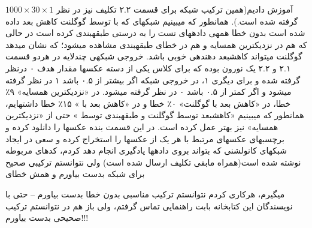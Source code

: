 \documentclass[10pt,a4paper]{article}
\newcommand{\نیمفاصله}{\halfspace}
\renewcommand{\ }{\halfspace}
\newcommand{\مق}{\lr}
\begin{document}
$1000 \times 30 \times 1$
آموزش دادیم(همین ترکیب شبکه برای قسمت ۲.۲ تکلیف نیز در نظر گرفته شده است.). همان\ طور که می\ بینیم شبکه\ ای که با توسط گوگل\ نت کاهش بعد داده شده است بدون خطا همه\ ی داده\ های تست را به درستی طبقه\ بندی کرده است در حالی که هم در نزدیک\ ترین همسایه و هم در \مق{PCA} خطای طبقه\ بندی مشاهده می\ شود؛ که نشان می\ دهد گوگل\ نت می\ تواند کاهش\ بعد دهنده\ ی خوبی باشد.
خروجی شبکه\ ی چندلایه در هردو قسمت ۲.۱ و ۲.۲ یک نورون بوده که برای کلاس یکی از دسته عکس\ ها مقدار هدف ۰ درنظر گرفته شده و برای دیگری ۱، در خروجی شبکه اگر بیشتر از ۰.۵ باشد ۱ در نظر گرفته می\ شود و اگر کمتر از ۰.۵ باشد ۰ در نظر گرفته می\ شود. در «نزدیک\ ترین همسایه» ۹٪ خطا، در «کاهش بعد با گوگل\ نت» ۰٪ خطا و در «کاهش بعد با \مق{PCA}» ۱۵٪ خطا داشته\ ایم، همان\ طور که می\ بینیم «کاهش\ بعد توسط گوگل\ نت و طبقه\ بندی توسط \مق{MLP}» حتی از «نزدیک\ ترین همسایه» نیز بهتر عمل کرده است.
در این قسمت بنده عکس\ ها را دانلود کرده و برچسب\ های عکس\ های مرتبط با هر یک از عکس\ ها را استخراج کرده و سعی در ایجاد شبکه\ ای کانولشنی که بتواند بروی داده\ ها یادگیری انجام دهد کردم، کدهای مربوطه نوشته شده است(همراه مابقی تکلیف ارسال شده است) ولی نتوانستم ترکیبی صحیح برای شبکه بدست بیاورم و همش خطای
\vspace{-1.4em}\begin{center}\end{center}\vspace{-1em}
میگیرم، هرکاری کردم نتوانستم ترکیب مناسبی بدون خطا بدست بیاورم -- حتی با نویسندگان این کتابخانه بابت راهنمایی تماس گرفتم، ولی باز هم در نتوانستم ترکیب صحیحی بدست بیاورم!!!
\end{document}

